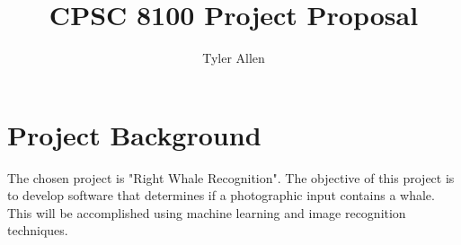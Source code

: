 \documentclass[11pt]{article}
\newcommand{\?}{\stackrel{?}{=}}
\begin{document}
\title{CPSC 8100 Project Proposal}
\date{}
\author{Tyler Allen}
\maketitle

\doublespacing

\section{Project Background}
The chosen project is "Right Whale Recognition"\cite{kaggle}. The objective of
this project is to develop software that determines if a photographic input 
contains a whale. This will be accomplished using machine learning and 
image recognition techniques.
\end{document}
